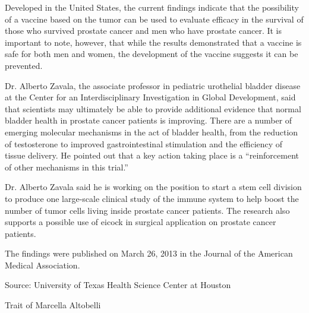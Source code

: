 \documentclass{article}
\begin{document}
Developed in the United States, the current findings indicate that the possibility of a vaccine based on the tumor can be used to evaluate efficacy in the survival of those who survived prostate cancer and men who have prostate cancer. It is important to note, however, that while the results demonstrated that a vaccine is safe for both men and women, the development of the vaccine suggests it can be prevented.

Dr. Alberto Zavala, the associate professor in pediatric urothelial bladder disease at the Center for an Interdisciplinary Investigation in Global Development, said that scientists may ultimately be able to provide additional evidence that normal bladder health in prostate cancer patients is improving. There are a number of emerging molecular mechanisms in the act of bladder health, from the reduction of testosterone to improved gastrointestinal stimulation and the efficiency of tissue delivery. He pointed out that a key action taking place is a “reinforcement of other mechanisms in this trial.”

Dr. Alberto Zavala said he is working on the position to start a stem cell division to produce one large-scale clinical study of the immune system to help boost the number of tumor cells living inside prostate cancer patients. The research also supports a possible use of eicock in surgical application on prostate cancer patients.

The findings were published on March 26, 2013 in the Journal of the American Medical Association.

Source: University of Texas Health Science Center at Houston

Trait of Marcella Altobelli
\end{document}
